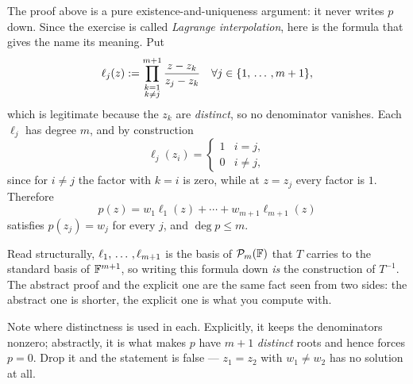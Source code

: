 \begin{ainote}
  The proof above is a pure existence-and-uniqueness argument: it never writes $p$ down. Since the exercise is called \emph{Lagrange interpolation}, here is the formula that gives the name its meaning. Put
  \begin{equation}
    \ell_j(z) := \prod_{\substack{k=1 \\ k \neq j}}^{m+1} \frac{z - z_k}{z_j - z_k} \quad \forall j \in \{1, {\, \ldots \,\,}, m+1\},
  \end{equation}
  which is legitimate because the $z_k$ are \emph{distinct}, so no denominator vanishes. Each $\ell_j$ has degree $m$, and by construction
  \begin{equation}
    \ell_j(z_i) = \begin{cases} 1 & i = j, \\ 0 & i \neq j, \end{cases}
  \end{equation}
  since for $i \neq j$ the factor with $k = i$ is zero, while at $z = z_j$ every factor is $1$. Therefore
  \begin{equation}
    p(z) = w_1 \ell_1(z) + \cdots + w_{m+1} \ell_{m+1}(z)
  \end{equation}
  satisfies $p(z_j) = w_j$ for every $j$, and $\deg p \leq m$.

  Read structurally, $\ell_1, {\, \ldots \,\,}, \ell_{m+1}$ is the basis of $\mathcal{P}_m(\mathbb{F})$ that $T$ carries to the standard basis of $\mathbb{F}^{m+1}$, so writing this formula down \emph{is} the construction of $T^{-1}$. The abstract proof and the explicit one are the same fact seen from two sides: the abstract one is shorter, the explicit one is what you compute with.

  Note where distinctness is used in each. Explicitly, it keeps the denominators nonzero; abstractly, it is what makes $p$ have $m+1$ \emph{distinct} roots and hence forces $p = 0$. Drop it and the statement is false --- $z_1 = z_2$ with $w_1 \neq w_2$ has no solution at all.
\end{ainote}
